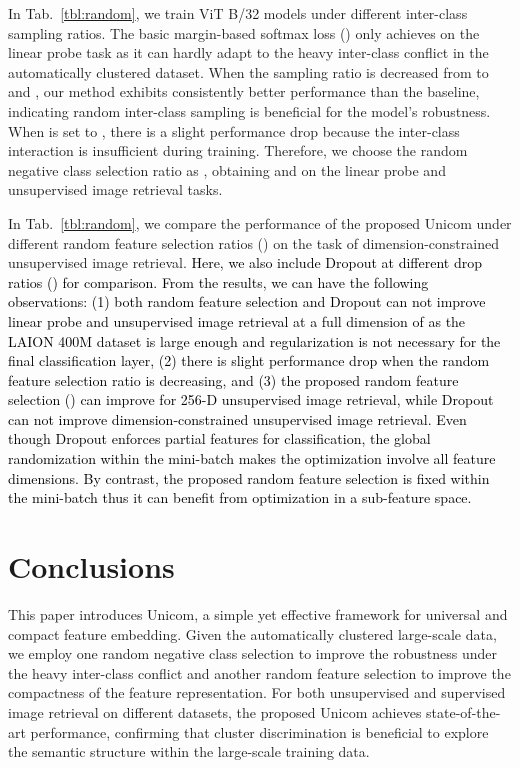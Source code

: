 \documentclass{article} \usepackage{iclr2023_conference,times}
\begin{document}
 In Tab.~\ref{tbl:random}, we train ViT B/32 models under different inter-class sampling ratios. The basic margin-based softmax loss () only achieves  on the linear probe task as it can hardly adapt to the heavy inter-class conflict in the automatically clustered dataset. When the sampling ratio is decreased from  to  and , our method exhibits consistently better performance than the baseline, indicating random inter-class sampling is beneficial for the model's robustness. When  is set to , there is a slight performance drop because the inter-class interaction is insufficient during training. Therefore, we choose the random negative class selection ratio as , obtaining  and  on the linear probe and unsupervised image retrieval tasks. 

In Tab.~\ref{tbl:random},  we compare the performance of the proposed Unicom under different random feature selection ratios () on the task of dimension-constrained unsupervised image retrieval.
\textcolor{black}{Here, we also include Dropout at different drop ratios () for comparison. From the results, we can have the following observations: (1) both random feature selection and Dropout can not improve linear probe and unsupervised image retrieval at a full dimension of  as the LAION 400M dataset is large enough and regularization is not necessary for the final classification layer, (2) there is slight performance drop when the random feature selection ratio is decreasing, and (3) the proposed random feature selection () can improve  for 256-D unsupervised image retrieval, while Dropout can not improve dimension-constrained unsupervised image retrieval. Even though Dropout enforces partial features for classification, the global randomization within the mini-batch makes the optimization involve all feature dimensions.
By contrast, the proposed random feature selection is fixed within the mini-batch thus it can benefit from optimization in a sub-feature space. }


\section{Conclusions}
This paper introduces Unicom, a simple yet effective framework for universal and compact feature embedding. Given the automatically clustered large-scale data, we employ one random negative class selection to improve the robustness under the heavy inter-class conflict and another random feature selection to improve the compactness of the feature representation. For both unsupervised and supervised image retrieval on different datasets, the proposed Unicom achieves state-of-the-art performance, confirming that cluster discrimination is beneficial to explore the semantic structure within the large-scale training data.
\end{document}
